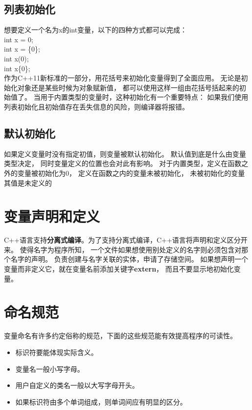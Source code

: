 \subsection{列表初始化}
想要定义一个名为x的int变量，以下的四种方式都可以完成：\\
int x = 0;\\
int x = \{0\};\\
int x(0);\\
int x\{0\};\\
作为C++11新标准的一部分，用花括号来初始化变量得到了全面应用。%
无论是初始化对象还是某些时候为对象赋新值，%
都可以使用这样一组由花括号括起来的初始值了。%
当用于内置类型的变量时，这种初始化有一个重要特点：%
如果我们使用列表初始化且初始值存在丢失信息的风险，则编译器将报错。%
\subsection{默认初始化}
如果定义变量时没有指定初值，则变量被默认初始化。%
默认值到底是什么由变量类型决定，%
同时变量定义的位置也会对此有影响。%
对于内置类型，定义在函数之外的变量被初始化为0，%
定义在函数之内的变量未被初始化，%
未被初始化的变量其值是未定义的%

\section{变量声明和定义}
C++语言支持{\bfseries{分离式编译}}。为了支持分离式编译，C++语言将声明和定义区分开来。%
{\color{red}{声明}}使得名字为程序所知，%
一个文件如果想使用别处定义的名字则必须包含对那个名字的声明。%
{\color{red}{定义}}负责创建与名字关联的实体，申请了存储空间。%
如果想声明一个变量而非定义它，就在变量名前添加关键字{\bfseries{extern}}，%
而且不要显示地初始化变量。%
{\color{red}{变量能且只能被定义一次，但是可以被多次声明。}}

\section{命名规范}
变量命名有许多约定俗称的规范，下面的这些规范能有效提高程序的可读性。%
\begin{itemize}
\item{标识符要能体现实际含义。}
\item{变量名一般小写字母。}
\item{用户自定义的类名一般以大写字母开头。}
\item{如果标识符由多个单词组成，则单词间应有明显的区分。{\color{red}{采用驼峰式命名。}}}
\end{itemize}

